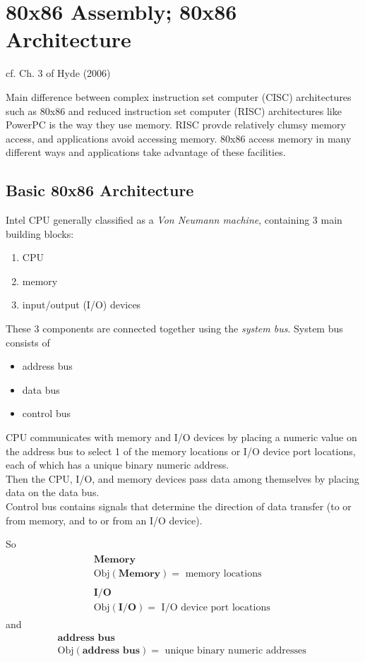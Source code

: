 \documentclass[10pt]{amsart}
\begin{document}
\section{80x86 Assembly; 80x86 Architecture}  

cf. Ch. 3 of Hyde (2006) \cite{Hyde2006}

Main difference between complex instruction set computer (CISC) architectures such as 80x86 and reduced instruction set computer (RISC) architectures like PowerPC is the way they use memory.  RISC provde relatively clumsy memory access, and applications avoid accessing memory.  80x86 access memory in many different ways and applications take advantage of these facilities.  

\subsection{Basic 80x86 Architecture}  

Intel CPU generally classified as a \emph{Von Neumann machine}, containing 3 main building blocks:
\begin{enumerate}
	\item CPU
	\item memory
	\item input/output (I/O) devices
\end{enumerate}
These 3 components are connected together using the \emph{system bus}.  System bus consists of 
\begin{itemize}
	\item address bus
	\item data bus
	\item control bus
\end{itemize}

CPU communicates with memory and I/O devices by placing a numeric value on the address bus to select 1 of the memory locations or I/O device port locations, each of which has a unique binary numeric address.   \\
Then the CPU, I/O, and memory devices pass data among themselves by placing data on the data bus.   \\
Control bus contains signals that determine the direction of data transfer (to or from memory, and to or from an I/O device).  

So 
\[
\begin{gathered}
\begin{gathered}
\textbf{Memory} \\
\text{Obj}{(\textbf{Memory})} = \text{ memory locations } 
\end{gathered} \\ 
\begin{gathered}
\textbf{I/O} \\
\text{Obj}{(\textbf{I/O})} = \text{ I/O device port locations } 
\end{gathered}
\end{gathered}
\]
and 
\[
\begin{gathered}
\textbf{address bus} \\
\text{Obj}{(\textbf{address bus})} = \text{ unique binary numeric addresses } 
\end{gathered}
\]
\end{document}
